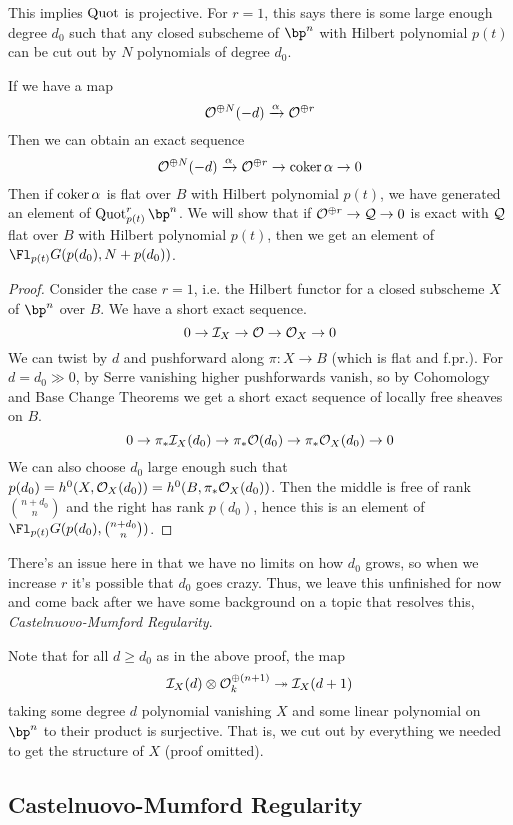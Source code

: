 \documentclass[12pt]{article}
\begin{document}
This implies $\operatorname{Quot}$ is projective. For $r = 1$, this says there is some large enough degree $d_0$ such that any closed subscheme of $\bp^n$ with Hilbert polynomial $p(t)$ can be cut out by $N$ polynomials of degree $d_0$.

If we have a map
\[\mathcal{O}^{\oplus N}(-d) \xrightarrow{\alpha} \mathcal{O}^{\oplus r}\]
Then we can obtain an exact sequence
\[\mathcal{O}^{\oplus N}(-d) \xrightarrow{\alpha} \mathcal{O}^{\oplus r} \to \operatorname{coker} \alpha \to 0\]
Then if $\operatorname{coker} \alpha$ is flat over $B$ with Hilbert polynomial $p(t)$, we have generated an element of $\Quot^r_{p(t)} \bp^n$. We will show that if $\mathcal{O}^{\oplus r} \to \mathcal{Q} \to 0$ is exact with $\mathcal{Q}$ flat over $B$ with Hilbert polynomial $p(t)$, then we get an element of $\Fl_{p(t)} G(p(d_0), N + p(d_0))$. 

\begin{proof}
  Consider the case $r = 1$, i.e. the Hilbert functor for a closed subscheme $X$ of $\bp^n$ over $B$. We have a short exact sequence.
  \[0 \to \mathcal{I}_X \to \mathcal{O} \to \mathcal{O}_X \to 0\]
  We can twist by $d$ and pushforward along $\pi \colon X \to B$ (which is flat and f.pr.). For $d = d_0 \gg 0$, by Serre vanishing higher pushforwards vanish, so by Cohomology and Base Change Theorems we get a short exact sequence of locally free sheaves on $B$.
  \[0 \to \pi_* \mathcal{I}_X(d_0) \to \pi_* \mathcal{O}(d_0) \to \pi_* \mathcal{O}_X(d_0) \to 0\]
  We can also choose $d_0$ large enough such that $p(d_0) = h^0(X, \mathcal{O}_X(d_0)) = h^0(B, \pi_* \mathcal{O}_X(d_0))$. Then the middle is free of rank $\binom{n+d_0}{n}$ and the right has rank $p(d_0)$, hence this is an element of $\Fl_{p(t)} G(p(d_0), \binom{n+d_0}{n})$.
\end{proof}

\begin{rem}
  There's an issue here in that we have no limits on how $d_0$ grows, so when we increase $r$ it's possible that $d_0$ goes crazy. Thus, we leave this unfinished for now and come back after we have some background on a topic that resolves this, \textit{Castelnuovo-Mumford Regularity}.
\end{rem}

Note that for all $d \geq d_0$ as in the above proof, the map 
\[\mathcal{I}_X(d) \otimes \mathcal{O}^{\oplus (n+1)}_k \twoheadrightarrow \mathcal{I}_X(d+1)\]
taking some degree $d$ polynomial vanishing $X$ and some linear polynomial on $\bp^n$ to their product is surjective. That is, we cut out by everything we needed to get the structure of $X$ (proof omitted).

\subsection{Castelnuovo-Mumford Regularity}
\end{document}
